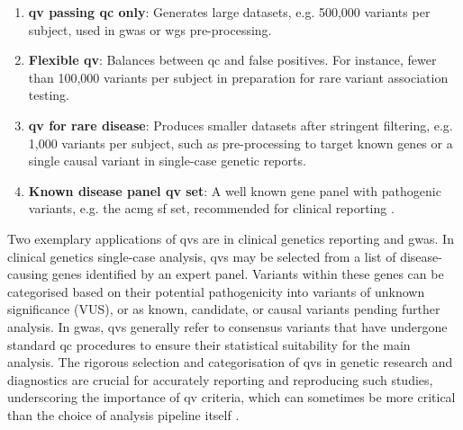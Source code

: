 \begin{enumerate}
    \item \textbf{\ac{qv} passing \ac{qc} only}: Generates large datasets, e.g. 500,000 variants per subject, used in \ac{gwas} or \ac{wgs} pre-processing.
    \item \textbf{Flexible \ac{qv}}: Balances between \ac{qc} and false positives. For instance, fewer than 100,000 variants per subject in preparation for rare variant association testing.
        \item \textbf{\ac{qv}  for rare disease}: Produces smaller datasets after stringent filtering, e.g. 1,000 variants per subject, such as pre-processing to target known genes or a single causal variant in single-case genetic reports.
   \item \textbf{Known disease panel \ac{qv} set}: A well known gene panel with pathogenic variants, e.g. the \ac{acmg} \ac{sf} set, recommended for clinical reporting \cite{miller2023acmg}. 
   
\end{enumerate}

Two exemplary applications of \ac{qv}s are in clinical genetics reporting and \ac{gwas}. 
In clinical genetics single-case analysis, \ac{qv}s may be selected from a list of disease-causing genes identified by an expert panel. 
Variants within these genes can be categorised based on their potential pathogenicity into variants of unknown significance (VUS), or as known, candidate, or causal variants pending further analysis. 
In \ac{gwas}, \ac{qv}s generally refer to consensus variants that have undergone standard \ac{qc} procedures to ensure their statistical suitability for the main analysis.
The rigorous selection and categorisation of \ac{qv}s in genetic research and diagnostics are crucial for accurately reporting and reproducing such studies, underscoring the importance of \ac{qv} criteria, which can sometimes be more critical than the choice of analysis pipeline itself 
\cite{olson2023variant}.

